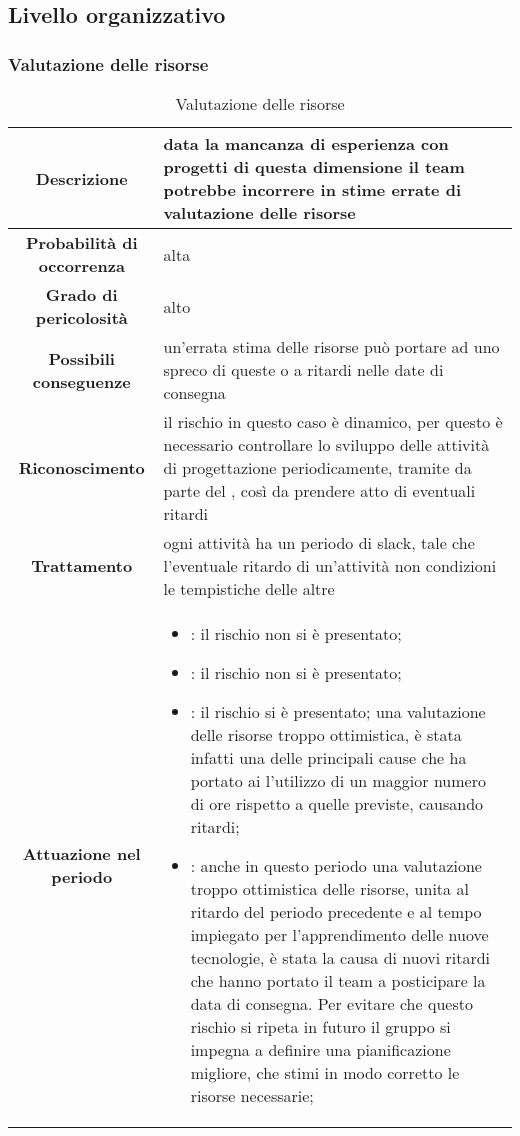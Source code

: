 \documentclass[PianoDiProgetto.tex]{subfiles}
\begin{document}
\clearpage		
	\subsection{Livello organizzativo}
	\subsubsection{Valutazione delle risorse}
		\label{sec:lo}
		
		
\begin{table}[h]
		\begin{center}
			\begin{tabular}{ | c | p{10cm} |}
				\hline		
		
		 \textbf{Descrizione} & data la mancanza di esperienza con progetti di questa dimensione il team potrebbe incorrere in stime errate di valutazione delle risorse \\ \hline
		 \textbf{Probabilità di occorrenza} & alta \\ \hline
		 \textbf{Grado di pericolosità} & alto \\ \hline
		 \textbf{Possibili conseguenze} & un'errata stima delle risorse può portare ad uno spreco di queste o a ritardi nelle date di consegna \\ \hline
		 \textbf{Riconoscimento} & il rischio in questo caso è dinamico, per questo è necessario controllare lo sviluppo delle attività di progettazione periodicamente, tramite  \gl{verifica} da parte del \RESP{}, così da prendere atto di eventuali ritardi \\ \hline
		 \textbf{Trattamento} & ogni attività ha un periodo di slack, tale che l'eventuale ritardo di un'attività non condizioni le tempistiche delle altre \\ \hline
		 \textbf{Attuazione nel periodo} &
			\begin{itemize}
				\item \PerAR : il rischio non si è presentato;
				\item \PerAD: il rischio non si è presentato;
				\item \PerPA: il rischio si è presentato; una valutazione delle risorse troppo ottimistica, è stata infatti una delle principali cause che ha portato ai \PJP{} l'utilizzo di un maggior numero di ore rispetto a quelle previste, causando ritardi;
				\item \PerPD: anche in questo periodo una valutazione troppo ottimistica delle risorse, unita al ritardo del periodo precedente e al tempo impiegato per l'apprendimento delle nuove tecnologie, è stata la causa di nuovi ritardi che hanno portato il team a posticipare la data di consegna. Per evitare che questo rischio si ripeta in futuro il gruppo si impegna a definire una pianificazione migliore, che stimi in modo corretto le risorse necessarie;
			\end{itemize}
			\\ \hline
	
		\end{tabular}
		\caption{Valutazione delle risorse}
		\end{center}	
	\end{table}	
	
\end{document}
